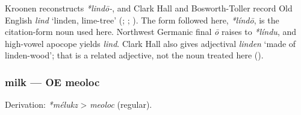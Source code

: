 \documentclass[
  british,
  a4paper,
]{article}
\begin{document}
Kroonen reconstructs \emph{*lindō-}, and Clark Hall and Bosworth-Toller
record Old English \emph{lind} `linden, lime-tree'
(;
;
). The
form followed here, \emph{*líndō}, is the citation-form noun used here.
Northwest Germanic final \emph{ō} raises to \emph{*líndu}, and
high-vowel apocope yields \emph{lind}. Clark Hall also gives adjectival
\emph{linden} `made of linden-wood'; that is a related adjective, not
the noun treated here ().

\subsubsection{milk --- OE meoloc}\label{milk-oe-meoloc}

Derivation: \emph{*mélukz} \textgreater{} \emph{meoloc} (regular).

\begingroup
\setlength{\fboxsep}{6pt}
\end{document}
